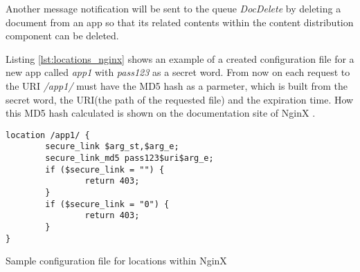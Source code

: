 Another message notification will be sent to the queue \textit{DocDelete} by deleting a document from an app so that its related contents within the content distribution component can be deleted.

Listing \ref{lst:locations_nginx} shows an example of a created configuration file for a new app called \textit{app1} with \textit{pass123} as a secret word. From now on each request to the URI \textit{/app1/} must have the MD5 hash as a parmeter, which is built from the secret word, the URI(the path of the requested file) and the expiration time. How this MD5 hash calculated is shown on the documentation site of NginX \cite{nginx:securelink}.

\begin{code}
\begin{verbatim}
location /app1/ {
        secure_link $arg_st,$arg_e;
        secure_link_md5 pass123$uri$arg_e;
        if ($secure_link = "") {
                return 403;
        }
        if ($secure_link = "0") {
                return 403;
        }
}
\end{verbatim}
\caption{Sample configuration file for locations within NginX}
\label{lst:locations_nginx}
\end{code}


	
	
	


